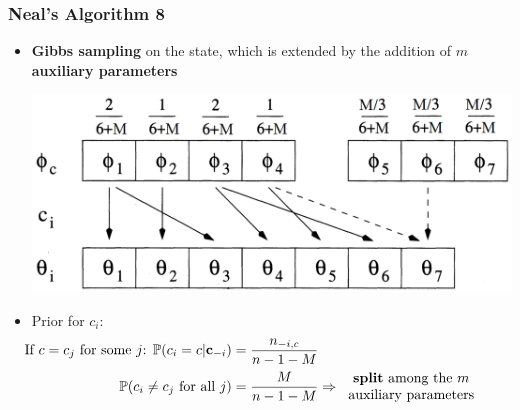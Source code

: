 \begin{frame}
	\frametitle{Neal's Algorithm 8}
	\begin{itemize}
		\item \textbf{Gibbs sampling} on the state, which is extended by the addition of $m$ \textbf{auxiliary parameters} \\
        \begin{center}
        	\includegraphics[scale=0.35]{etc/neal8.png}
        \end{center}
		
        \item Prior for $c_{i}$:
            \begin{align*}
            \hspace{-25pt}
            \vspace{-12pt}
                \text{If $c=c_j$ for some $j$: } \PP(c_i=c | \mathbf c_{-i}) &= \frac{n_{-i,c}}{n-1-M}  \\
                \PP(c_{i}\neq c_{j} \text{ for all } j) &=\frac{M }{n-1-M}  \Rightarrow 
                \begin{tabular}{c}
                \textbf{split} among the $m$ \\
                auxiliary parameters 
                \end{tabular}
            \end{align*}	
	\end{itemize}
\end{frame}


